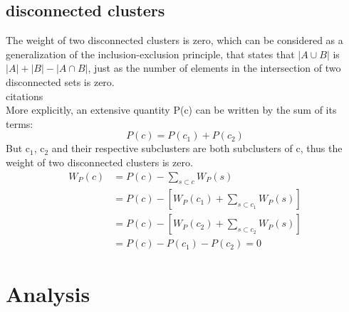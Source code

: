 \documentclass{article}
\begin{document}
\subsection{disconnected clusters}
The weight of two disconnected clusters is zero, which can be considered as a generalization of the
inclusion-exclusion principle, that states that $|A \cup B|$ is $|A|
+ |B| - |A \cap B|$, just as the number of elements in
the intersection of two disconnected sets is zero.\\
citations\\
More explicitly, an extensive quantity P(c) can be written by the sum of its terms:
\begin{equation}
\label{eq:7}
P(c) = P(c_1) + P(c_2)
\end{equation}
But c$_1$, c$_2$ and their respective subclusters are both
subclusters of c, thus the weight of two disconnected clusters is zero.
\begin{align}
\label{eq:8}
W_P(c) &= P(c) - \sum\limits_{s \subset c} W_P(s)\\
&= P(c) - \left[ W_P(c_1) + \sum\limits_{s \subset c_1} W_P(s)
  \right]\\
&= P(c) - \left[ W_P(c_2) + \sum\limits_{s \subset c_2} W_P(s)
  \right]\\
&= P(c) - P(c_1) -P(c_2) = 0
\end{align}



\section{Analysis}
\end{document}
